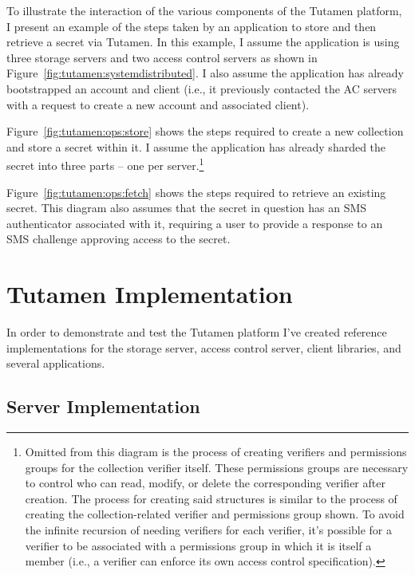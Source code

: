 To illustrate the interaction of the various components of the Tutamen
platform, I present an example of the steps taken by an application to
store and then retrieve a secret via Tutamen. In this example, I
assume the application is using three storage servers and two access
control servers as shown in
Figure~\ref{fig:tutamen:systemdistributed}. I also assume the
application has already bootstrapped an account and client (i.e., it
previously contacted the AC servers with a request to create a new
account and associated client).

Figure~\ref{fig:tutamen:ops:store} shows the steps required to create
a new collection and store a secret within it. I assume the
application has already sharded the secret into three parts -- one per
server.\footnote{Omitted from this diagram is the process of creating
  verifiers and permissions groups for the collection verifier
  itself. These permissions groups are necessary to control who can
  read, modify, or delete the corresponding verifier after
  creation. The process for creating said structures is similar to the
  process of creating the collection-related verifier and permissions
  group shown. To avoid the infinite recursion of needing verifiers
  for each verifier, it's possible for a verifier to be associated
  with a permissions group in which it is itself a member (i.e., a
  verifier can enforce its own access control specification).}

Figure~\ref{fig:tutamen:ops:fetch} shows the steps required to
retrieve an existing secret. This diagram also assumes that the secret
in question has an SMS authenticator associated with it, requiring a
user to provide a response to an SMS challenge approving access to the
secret.

\section{Tutamen Implementation}
\label{chap:tutamen:imp}

In order to demonstrate and test the Tutamen platform I've created
reference implementations for the storage server, access control
server, client libraries, and several applications.

\subsection{Server Implementation}
\label{chap:tutamen:imp:server}

